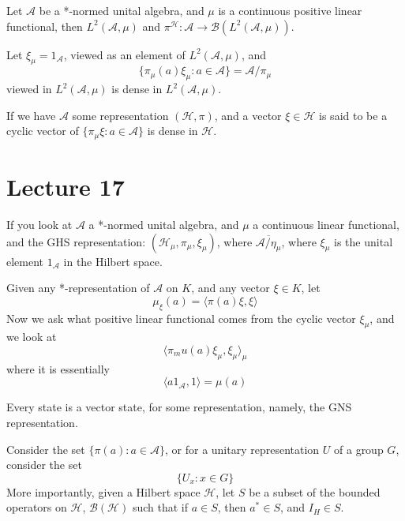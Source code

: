 Let $\mathcal{A}$ be a *-normed unital algebra, and $\mu$ is a continuous positive linear functional, then
$L^2(\mathcal{A}, \mu)$ and $\pi^\mathcal{H}: \mathcal{A}\to \mathcal{B}(L^2(\mathcal{A}, \mu))$. 

Let $\xi_\mu=1_\mathcal{A}$, viewed as an element of $L^2(\mathcal{A}, \mu)$, and 
\begin{equation*}
    \{ \pi_\mu(a)\xi_\mu: a\in\mathcal{A}\}=\mathcal{A}/\pi_\mu
\end{equation*}
viewed in $L^2(\mathcal{A}, \mu)$ is dense in $L^2(\mathcal{A}, \mu)$.

\begin{definition}
    If we have $\mathcal{A}$ some representation $(\mathcal{H}, \pi)$, and a vector $\xi\in\mathcal{H}$ is said to be a cyclic vector of $
    \{\pi_\mu\xi: a\in\mathcal{A}\}$ is dense in $\mathcal{H}$.
\end{definition}

\section{Lecture 17}
If you look at $\mathcal{A}$ a *-normed unital algebra, and $\mu$ a continuous linear functional, and the GHS representation: $(\mathcal{H}_\mu, \pi_\mu, \xi_\mu)$, where $\overline{\mathcal{A}/\eta_\mu}$, where $\xi_\mu$ is the unital element $1_\mathcal{A}$ in the Hilbert space.

Given any *-representation of $\mathcal{A}$ on $K$, and any vector $\xi\in K$, let 
\begin{equation*}
    \mu_\xi(a)=\langle \pi(a)\xi, \xi\rangle
\end{equation*} 
Now we ask what positive linear functional comes from the cyclic vector $\xi_\mu$, and we look at 
\begin{equation*}
    \langle \pi_mu(a)\xi_\mu, \xi_\mu\rangle_\mu
\end{equation*}
where it is essentially
\begin{equation*}
    \langle a1_\mathcal{A}, 1\rangle=\mu(a)
\end{equation*}

Every state is a vector state, for some representation, namely, the GNS representation.

Consider the set $\{\pi(a): a\in\mathcal{A}\}$, or for a unitary representation $U$ of a group $G$, consider the set
\begin{equation*}
    \{U_x: x\in G\}
\end{equation*}
More importantly, given a Hilbert space $\mathcal{H}$, let $S$ be a subset of the bounded operators on $\mathcal{H}$, $\mathcal{B}(\mathcal{H})$ such that if $a\in S$, then $a^*\in S$, and $I_H\in S$.

